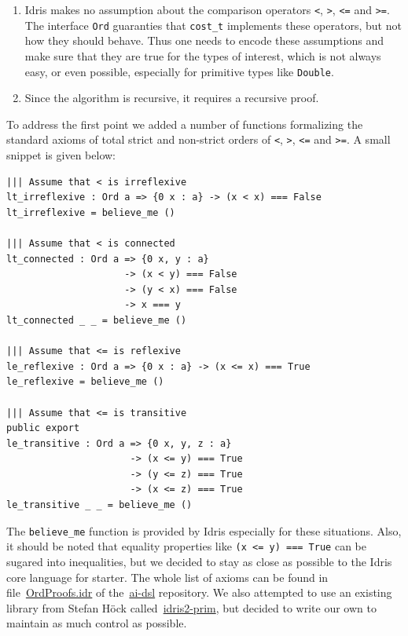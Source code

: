 \documentclass[]{report}
\begin{document}
\begin{enumerate}
\item Idris makes no assumption about the comparison operators
  \texttt{<}, \texttt{>}, \texttt{<=} and \texttt{>=}.  The interface
  \texttt{Ord} guaranties that \texttt{cost\_t} implements these
  operators, but not how they should behave.  Thus one needs to encode
  these assumptions and make sure that they are true for the types of
  interest, which is not always easy, or even possible, especially for
  primitive types like \texttt{Double}.
\item Since the algorithm is recursive, it requires a recursive proof.
\end{enumerate}
To address the first point we added a number of functions formalizing
the standard axioms of total strict and non-strict orders of
\texttt{<}, \texttt{>}, \texttt{<=} and \texttt{>=}.  A small snippet
is given below:
\begin{verbatim}
||| Assume that < is irreflexive
lt_irreflexive : Ord a => {0 x : a} -> (x < x) === False
lt_irreflexive = believe_me ()

||| Assume that < is connected
lt_connected : Ord a => {0 x, y : a}
                     -> (x < y) === False
                     -> (y < x) === False
                     -> x === y
lt_connected _ _ = believe_me ()

||| Assume that <= is reflexive
le_reflexive : Ord a => {0 x : a} -> (x <= x) === True
le_reflexive = believe_me ()

||| Assume that <= is transitive
public export
le_transitive : Ord a => {0 x, y, z : a}
                      -> (x <= y) === True
                      -> (y <= z) === True
                      -> (x <= z) === True
le_transitive _ _ = believe_me ()
\end{verbatim}
The \texttt{believe\_me} function is provided by Idris especially for
these situations.  Also, it should be noted that equality properties
like \texttt{(x <= y) === True} can be sugared into inequalities, but
we decided to stay as close as possible to the Idris core language for
starter.  The whole list of axioms can be found in
file~\href{https://github.com/singnet/ai-dsl/blob/master/experimental/ai-algorithms/descent/Search/OrdProofs.idr}{OrdProofs.idr}
of the~\href{https://github.com/singnet/ai-dsl}{ai-dsl} repository.
We also attempted to use an existing library from Stefan H\"ock
called~\href{https://github.com/stefan-hoeck/idris2-prim}{idris2-prim},
but decided to write our own to maintain as much control as possible.\\
\end{document}
